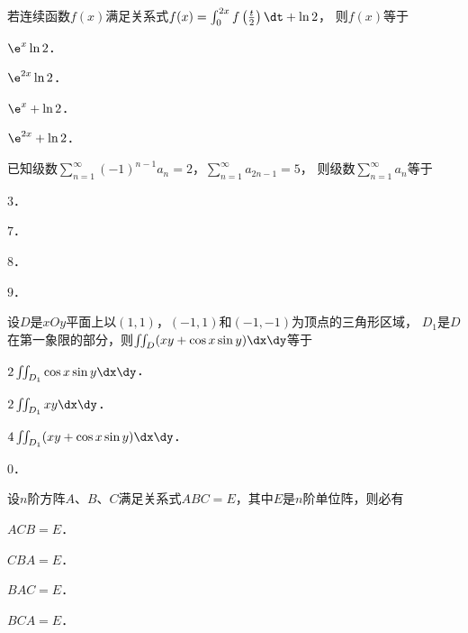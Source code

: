 \documentclass[plain,noanswer,medmath]{../../template/jnuexam}
\begin{document}
\begin{problem}
若连续函数$f(x)$满足关系式$f(x) = \int_0^{2x} f\left(\frac{t}{2} \right) \dt + \ln 2$，
则$f(x)$等于\pickout{}
\begin{abcd}
\item $\e^x\ln 2$．		
\item $\e^{2x}\ln 2$．		
\item $\e^x + \ln 2$．		
\item $\e^{2x} + \ln 2$．
\end{abcd}
\end{problem}


\begin{problem}
已知级数$\sum_{n = 1}^{\infty}(- 1)^{n - 1} a_n = 2$，$\sum_{n = 1}^{\infty}a_{2n - 1} = 5$，
则级数$\sum_{n = 1}^{\infty}a_n$等于\pickout{}
\begin{abcd}
\item $3$．			
\item $7$．			
\item $8$．			
\item $9$．
\end{abcd}
\end{problem}


\begin{problem}
设$D$是$xOy$平面上以$(1,1)$，$(- 1,1)$和$(- 1, - 1)$为顶点的三角形区域，
$D_1$是$D$在第一象限的部分，则$\iint_D (xy + \cos x\sin y)\dx\dy$等于\pickout{}
\begin{abcd}
\item $2\iint_{D_1} \cos x\sin y\dx\dy$．
\item $2\iint_{D_1} xy\dx\dy$．
\item $4\iint_{D_1} (xy + \cos x\sin y)\dx\dy$．
\item $0$．
\end{abcd}
\end{problem}


\begin{problem}
设$n$阶方阵$A$、$B$、$C$满足关系式$ABC = E$，其中$E$是$n$阶单位阵，则必有\pickout{}
\begin{abcd}
\item $ACB = E$．    
\item $CBA = E$．    
\item $BAC = E$．    
\item $BCA = E$．
\end{abcd}
\end{problem}


\end{document}
